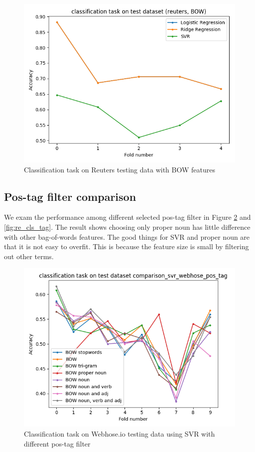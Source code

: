 \documentclass[sigconf]{acmart}
\begin{document}
\begin{figure}
  \includegraphics[width=\linewidth]{../../picture/experiment/classification_test_(reuters,_BOW).png}
  \caption{Classification task on Reuters testing data with BOW features}
  \label{fig:re_cls_bow}
\end{figure}

\subsection{Pos-tag filter comparison}
We exam the performance among different selected pos-tag filter in Figure \ref{fig:web_cls_tag} and \ref{fig:re_cls_tag}. The result shows choosing only proper noun has little difference with other bag-of-words features.
The good things for SVR and proper noun are that it is not easy to overfit. This is because the feature size is small by filtering out other terms.

\begin{figure}
  \includegraphics[width=\linewidth]{../../picture/experiment/classification_test_comparison_svr_webhose_pos_tag.png}
  \caption{Classification task on Webhose.io testing data using SVR with different pos-tag filter}
  \label{fig:web_cls_tag}
\end{figure}
\end{document}
